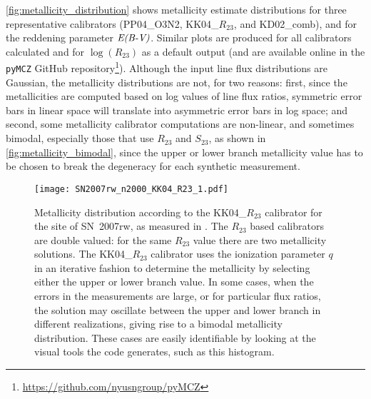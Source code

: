 \documentclass{emulateapj}
\newcommand{\ebmv}{\ensuremath{\mathrm{\emph{E(B-V)}}}}
\begin{document}
\autoref{fig:metallicity_distribution} shows metallicity estimate
distributions for three representative calibrators (PP04\_O3N2,
KK04\_$R_{23}$, and KD02\_comb), and for the reddening parameter
\ebmv. Similar plots are produced for all calibrators calculated and
for $\log(R_{23})$ as a default output (and are available online in
the \verb=pyMCZ= GitHub
repository\footnote{\url{https://github.com/nyusngroup/pyMCZ}}). Although
the input line flux distributions are Gaussian, the metallicity
distributions are not, for two reasons: first, since the metallicities
are computed based on log values of line flux ratios, symmetric error
bars in linear space will translate into asymmetric error bars in log
space; and second, some metallicity calibrator computations are
non-linear, and sometimes bimodal, especially those that use $R_{23}$
and $S_{23}$, as shown in \autoref{fig:metallicity_bimodal}, since the
upper or lower branch metallicity value has to be chosen to break the
degeneracy for each synthetic measurement.

\begin{figure}[ht!]
\texttt{[image: SN2007rw\_n2000\_KK04\_R23\_1.pdf]}
\caption{Metallicity distribution according to the KK04\_$R_{23}$
  calibrator for the site of SN~2007rw, as measured in
  \citet{modjaz11}. The $R_{23}$ based calibrators are double valued:
  for the same $R_{23}$ value there are two metallicity solutions. The
  KK04\_$R_{23}$ calibrator uses the ionization parameter $q$ in an
  iterative fashion to determine the metallicity by selecting either
  the upper or lower branch value. In some cases, when the errors in
  the measurements are large, or for particular flux ratios, the
  solution may oscillate between the upper and lower branch in
  different realizations, giving rise to a bimodal metallicity
  distribution. These cases are easily identifiable by looking at the
  visual tools the code generates, such as this
  histogram.}\label{fig:metallicity_bimodal}
\end{figure}
\end{document}
